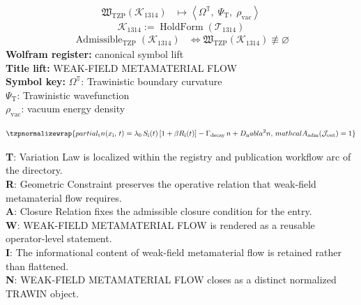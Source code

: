\noindent
\begin{minipage}[t]{0.48\linewidth}
\begingroup
\small
\[
\begin{aligned}
\mathfrak{W}_{\mathrm{TZP}}\!\left(\mathcal{K}_{1314}\right)
&\longmapsto
\left\langle \Omega^{\mathbb{T}},\; \Psi_{\mathrm{T}},\; \rho_{\mathrm{vac}} \right\rangle
\end{aligned}
\]
\[
\mathcal{K}_{1314}
:=
\operatorname{HoldForm}\!\left(\mathcal{T}_{1314}\right)
\]
\[
\begin{aligned}
\operatorname{Admissible}_{\mathrm{TZP}}\!\left(\mathcal{K}_{1314}\right)
&\Longleftrightarrow
\mathfrak{W}_{\mathrm{TZP}}\!\left(\mathcal{K}_{1314}\right)\not\equiv\varnothing
\end{aligned}
\]
\textbf{Wolfram register:} canonical symbol lift\\
\textbf{Title lift:} WEAK-FIELD METAMATERIAL FLOW\\
\textbf{Symbol key:} \(\Omega^{\mathbb{T}}\): Trawinistic boundary curvature\\ \(\Psi_{\mathrm{T}}\): Trawinistic wavefunction\\ \(\rho_{\mathrm{vac}}\): vacuum energy density
\par
\endgroup
\end{minipage}\hfill
\begin{minipage}[t]{0.48\linewidth}
\[
\tzpnormalizewrap{partial_{\mathrm{t}} n(x_{\mathrm{i}},\,t) = \lambda_0\,S_{\mathrm{i}}(t)\,[1+\beta R_{\mathrm{i}}(t)] - \Gamma_{\rm decay}\,n + D_{\mathrm{n}} abla^2 n,\,mathcal{A}_{\mathrm{adm}}\!\left(\mathcal{J}_{\mathrm{out}}\right)=1}
\]

\small
\textbf{T}: Variation Law is localized within the registry and publication workflow arc of the directory.\\
\textbf{R}: Geometric Constraint preserves the operative relation that weak-field metamaterial flow requires.\\
\textbf{A}: Closure Relation fixes the admissible closure condition for the entry.\\
\textbf{W}: WEAK-FIELD METAMATERIAL FLOW is rendered as a reusable operator-level statement.\\
\textbf{I}: The informational content of weak-field metamaterial flow is retained rather than flattened.\\
\textbf{N}: WEAK-FIELD METAMATERIAL FLOW closes as a distinct normalized TRAWIN object.
\normalsize
\end{minipage}


